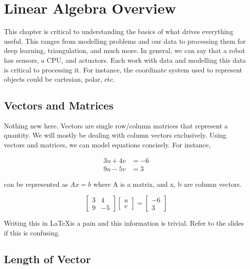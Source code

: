 \chapter{Linear Algebra Overview}

This chapter is critical to understanding the basics of what drives everything useful. This ranges from modelling problems and our data to processing them for deep learning, triangulation, and much more. In general, we can say that a robot has sensors, a CPU, and actuators. Each work with data and modelling this data is critical to processing it. For instance, the coordinate system used to represent objects could be cartesian, polar, etc.

\section{Vectors and Matrices}

Nothing new here. Vectors are single row/column matrices that represent a quantity. We will mostly be dealing with column vectors exclusively. Using vectors and matrices, we can model equations concisely. For instance,

\begin{equation*}
\begin{split}
    3u + 4v & = -6 \\
    9u - 5v &= 3
\end{split}
\end{equation*}

can be represented as $Ax = b$ where A is a matrix, and x, b are column vectors.

\begin{equation*}
    \begin{bmatrix}
    3 & 4 \\
    9 & -5
    \end{bmatrix} 
    \begin{bmatrix}
    u \\
    v
    \end{bmatrix}
    =
    \begin{bmatrix}
    -6 \\
    3
    \end{bmatrix}
\end{equation*}

Writing this in \LaTeX  is a pain and this information is trivial. Refer to the slides if this is confusing.

\section{Length of Vector}

